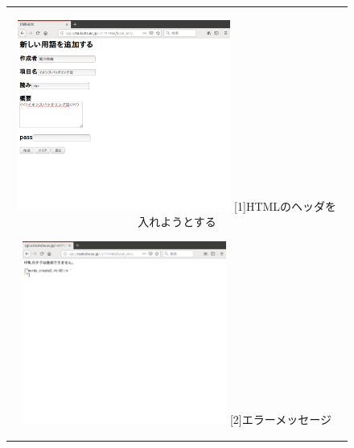 \documentclass[12pt,a4paper]{jarticle}
\begin{document}
\begin{ttfamily}
\begin{figure}[htbp]
  \begin{center}
    \begin{tabular}{c}

      \begin{minipage}{0.55\hsize}
        \begin{center}
          \includegraphics[width=7.0cm]{10-3-35.eps}
          \hspace{1.6cm} [1]HTMLのヘッダを入れようとする
        \end{center}
      \end{minipage}

      \begin{minipage}{0.55\hsize}
        \begin{center}
          \includegraphics[width=6.7cm]{10-3-36.eps}
          \hspace{1.6cm} [2]エラーメッセージ
        \end{center}
      \end{minipage}

      \begin{minipage}{0.55\hsize}
        \vspace{90mm}
      \end{minipage} \\
 

\end{tabular}
\end{center}
\end{figure}
\end{ttfamily}
\end{document}
